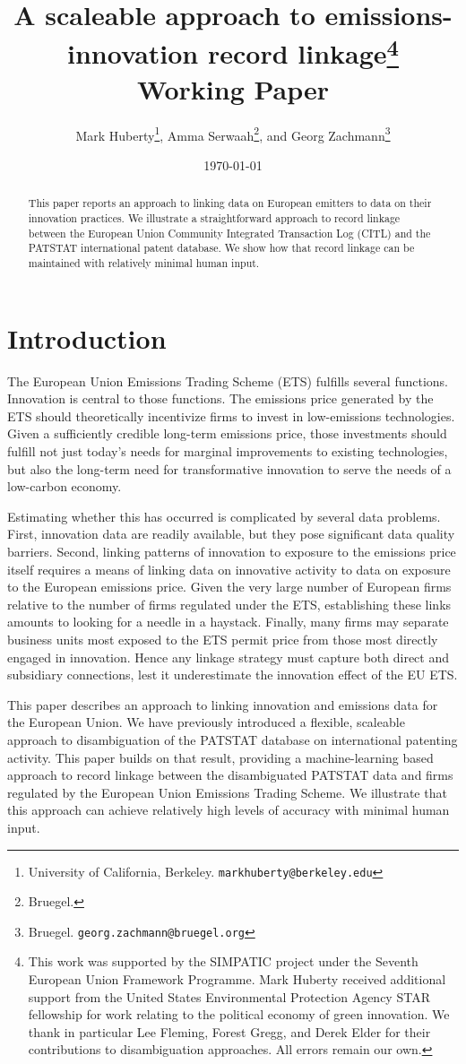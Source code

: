 \documentclass[11pt]{article}
\title{A scaleable approach to emissions-innovation record linkage\thanks{This
    work was supported by the SIMPATIC project under the Seventh European Union Framework Programme. Mark Huberty received additional support from the United States
    Environmental Protection Agency STAR fellowship for work relating to
    the political economy of green innovation. We thank in particular
    Lee Fleming, Forest Gregg, and Derek Elder for their contributions
    to disambiguation approaches. All errors remain our own.}\\
  Working Paper}
\author{Mark Huberty\thanks{University of California,
    Berkeley. \texttt{markhuberty@berkeley.edu}}, Amma
  Serwaah\thanks{Bruegel.}, and Georg Zachmann\thanks{Bruegel. \texttt{georg.zachmann@bruegel.org}}}
\date{\today}
\begin{document}
\maketitle
\doublespacing

\begin{abstract}
  This paper reports an approach to linking data on European emitters
  to data on their innovation practices. We illustrate a
  straightforward approach to record linkage between the European
  Union Community Integrated Transaction Log (CITL) and the PATSTAT
  international patent database. We show how that record linkage can
  be maintained with relatively minimal human input. 
\end{abstract}

\section{Introduction}
\label{sec:introduction}

The European Union Emissions Trading Scheme (ETS) fulfills several
functions. Innovation is central to those functions. The emissions
price generated by the ETS should theoretically incentivize firms to
invest in low-emissions technologies. Given a sufficiently credible
long-term emissions price, those investments should fulfill not just
today's needs for marginal improvements to existing technologies, but
also the long-term need for transformative innovation to serve the
needs of a low-carbon economy. 

Estimating whether this has occurred is complicated by several data
problems. First, innovation data are readily available, but they pose
significant data quality barriers. Second, linking patterns of
innovation to exposure to the emissions price itself requires a means
of linking data on innovative activity to data on exposure to the
European emissions price. Given the very large number of European
firms relative to the number of firms regulated under the ETS,
establishing these links amounts to looking for a needle in a
haystack. Finally, many firms may separate business units most exposed
to the ETS permit price from those most directly engaged in
innovation. Hence any linkage strategy must capture both direct and
subsidiary connections, lest it underestimate the innovation effect of
the EU ETS.

This paper describes an approach to linking innovation and emissions
data for the European Union. We \citep{huberty2013a} have previously
introduced a flexible, scaleable approach to disambiguation of the
PATSTAT database on international patenting activity. This paper builds on that result, providing a
machine-learning based approach to record linkage between the
disambiguated PATSTAT data and firms regulated by the European Union
Emissions Trading Scheme. We
illustrate that this approach can achieve relatively high levels of
accuracy with minimal human input.
\end{document}
